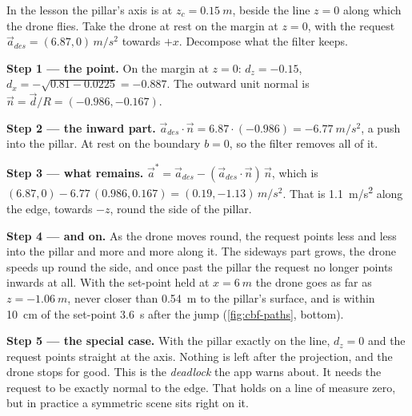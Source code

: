\begin{example}
\label{ex:cbf-slide}
In the lesson the pillar's axis is at $z_c = \SI{0.15}{m}$, beside the line $z = 0$ along which the drone flies. Take the drone at rest on the margin at $z = 0$, with the request $\vec a_{des} = (6.87, 0)\,\si{m/s^2}$ towards $+x$. Decompose what the filter keeps.

\textbf{Step 1 — the point.} On the margin at $z = 0$: $d_z = -0.15$, $d_x = -\sqrt{0.81 - 0.0225} = -0.887$. The outward unit normal is $\vec n = \vec d/R = (-0.986, -0.167)$.

\textbf{Step 2 — the inward part.} $\vec a_{des}\cdot\vec n = 6.87 \cdot (-0.986) = \SI{-6.77}{m/s^2}$, a push into the pillar. At rest on the boundary $b = 0$, so the filter removes all of it.

\textbf{Step 3 — what remains.} $\vec a^* = \vec a_{des} - (\vec a_{des}\cdot\vec n)\,\vec n$, which is $(6.87, 0) - 6.77\,(0.986, 0.167) = (0.19, -1.13)\,\si{m/s^2}$. That is \SI{1.1}{m/s^2} along the edge, towards $-z$, round the side of the pillar.

\textbf{Step 4 — and on.} As the drone moves round, the request points less and less into the pillar and more and more along it. The sideways part grows, the drone speeds up round the side, and once past the pillar the request no longer points inwards at all. With the set-point held at $x = \SI{6}{m}$ the drone goes as far as $z = \SI{-1.06}{m}$, never closer than \SI{0.54}{m} to the pillar's surface, and is within \SI{10}{cm} of the set-point \SI{3.6}{s} after the jump (\cref{fig:cbf-paths}, bottom).

\textbf{Step 5 — the special case.} With the pillar exactly on the line, $d_z = 0$ and the request points straight at the axis. Nothing is left after the projection, and the drone stops for good. This is the \emph{deadlock} the app warns about. It needs the request to be exactly normal to the edge. That holds on a line of measure zero, but in practice a symmetric scene sits right on it.
\end{example}

